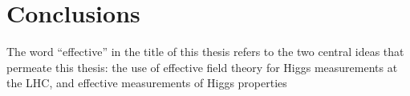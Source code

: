  
\chapter{Conclusions}
\label{chapter:conclusions}


The word ``effective'' in the title of this thesis refers to the two
central ideas that permeate this thesis: the use of effective field
theory for Higgs measurements at the LHC, and effective measurements
of Higgs properties
